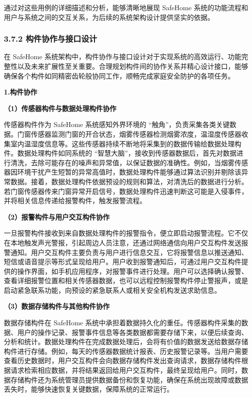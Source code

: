 通过对这些用例的详细描述和分析，能够清晰地展现 SafeHome 系统的功能流程和用户与系统之间的交互关系，为后续的系统架构设计提供坚实的依据。

\subsubsection{3.7.2 构件协作与接口设计}\label{ux6784ux4ef6ux534fux4f5cux4e0eux63a5ux53e3ux8bbeux8ba1}

在 SafeHome 系统架构中，构件协作与接口设计对于实现系统的高效运行、功能完整性以及未来扩展性至关重要。合理规划构件间的协作关系并精心设计接口，能够确保各个构件如同精密齿轮般协同工作，顺畅完成家庭安全防护的各项任务。

\textbf{1.构件协作}

\textbf{（1）传感器构件与数据处理构件协作}

传感器构件作为 SafeHome 系统感知外界环境的 ``触角''，负责采集各类关键数据。门窗传感器监测门窗的开合状态，烟雾传感器检测烟雾浓度，温湿度传感器收集室内温湿度信息等。这些传感器持续不断地将采集到的数据传输给数据处理构件。数据处理构件如同系统的 ``智慧大脑''，接收到传感器数据后，首先对数据进行清洗，去除可能存在的噪声和异常值，以保证数据的准确性。例如，当烟雾传感器因环境干扰产生短暂的异常高值时，数据处理构件能够通过算法识别并剔除该异常数据。接着，数据处理构件依据预设的规则和算法，对清洗后的数据进行分析。若门窗传感器传来门窗异常开启信号，数据处理构件迅速判断这可能是入侵事件，并将相关信息传递给报警构件，触发报警流程。

\textbf{（2）报警构件与用户交互构件协作}

一旦报警构件接收到来自数据处理构件的报警指令，便立即启动报警流程。它不仅在本地触发声光警报，引起周边人员注意，还通过网络通信向用户交互构件发送报警通知。用户交互构件主要负责与用户进行信息交互，它将报警信息以推送通知、短信或语音提示等形式呈现给用户。用户收到报警通知后，可通过用户交互构件提供的操作界面，如手机应用程序，对报警事件进行处理。用户可以选择确认报警、查看详细报警位置和相关传感器数据，也可以远程控制报警构件停止警报声，或是启动紧急联系功能，向预设的紧急联系人或相关安全机构发送求助信息。

\textbf{（3）数据存储构件与其他构件协作}

数据存储构件在 SafeHome 系统中承担着数据持久化的重任。传感器构件采集的数据、用户的操作记录、报警事件信息等各类数据都需要存储下来，以便后续查询、分析和统计。数据处理构件在完成数据处理后，会将有价值的数据发送给数据存储构件进行存储。例如，每天的传感器数据统计报表、历史报警记录等。当用户需要查看历史数据时，用户交互构件会向数据存储构件发出查询请求，数据存储构件根据请求检索相应数据，并将结果返回给用户交互构件，最终呈现给用户。同时，数据存储构件还为系统管理员提供数据备份和恢复功能，确保在系统出现故障或数据丢失时，能够快速恢复关键数据，保障系统的正常运行。

